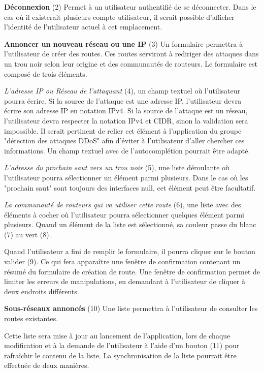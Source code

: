 \textbf{Déconnexion} (2)\newline
Permet à un utilisateur authentifié de se déconnecter.
Dans le cas où il existerait plusieurs compte utilisateur, il serait possible d'afficher l'identité de l'utilisateur actuel à cet emplacement.\newline

\textbf{Annoncer un nouveau réseau ou une IP} (3)\newline
Un formulaire permettra à l'utilisateur de créer des routes. Ces routes serviront à rediriger des attaques dans un trou noir selon leur origine et des communautés de routeurs. Le formulaire est composé de trois éléments.

\textit{L'adresse IP ou Réseau de l'attaquant} (4), un champ textuel où l'utilisateur pourra écrire.
Si la source de l'attaque est une adresse IP, l'utilisateur devra écrire son adresse IP en notation IPv4.
Si la source de l'attaque est un réseau, l'utilisateur devra respecter la notation IPv4 et CIDR, sinon la validation sera impossible. Il serait pertinent de relier cet élément à l'application du groupe "détection des attaques DDoS" afin d'éviter à l'utilisateur d'aller chercher ces informations.
Un champ textuel avec de l'autocomplétion pourrait être adapté.

\textit{L'adresse du prochain saut vers un trou noir} (5), une liste déroulante où l'utilisateur pourra sélectionner un élément parmi plusieurs. Dans le cas où les "prochain saut" sont toujours des interfaces null, cet élément peut être facultatif.

\textit{La communauté de routeurs qui va utiliser cette route} (6), une liste avec des éléments à cocher où l'utilisateur pourra sélectionner quelques élément parmi plusieurs.
Quand un élément de la liste est sélectionné, sa couleur passe du blanc (7) au vert (8).

Quand l'utilisateur a fini de remplir le formulaire, il pourra cliquer sur le bouton valider (9).
Ce qui fera apparaître une fenêtre de confirmation contenant un résumé du formulaire de création de route.
Une fenêtre de confirmation permet de limiter les erreurs de manipulations, en demandant à l'utilisateur de cliquer à deux endroits différents.\newline

\textbf{Sous-réseaux annoncés} (10)\newline
Une liste permettra à l'utilisateur de consulter les routes existantes.

Cette liste sera mise à jour au lancement de l'application, lors de chaque modification et à la demande de l'utilisateur à l'aide d'un bouton (11) pour rafraîchir le contenu de la liste.
La synchronisation de la liste pourrait être effectuée de deux manières.

